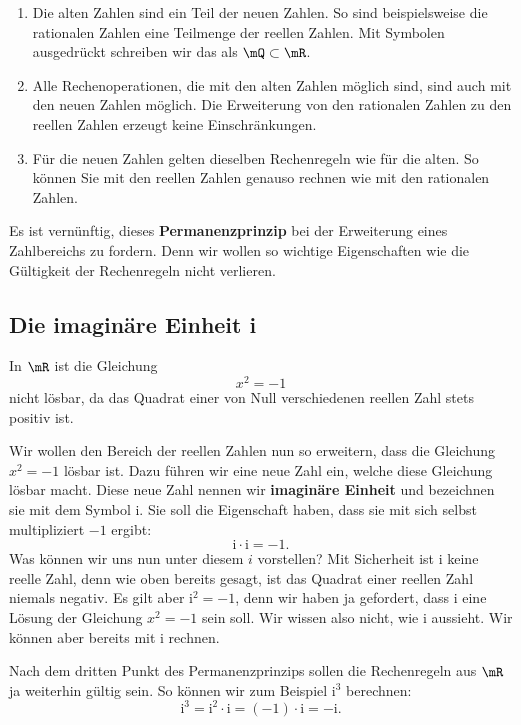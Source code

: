 \documentclass[%
11pt,%
twoside,%
titlepage,%
german,%
headsepline%
]{scrartcl}
\begin{document}
\begin{enumerate}
\item Die alten Zahlen sind ein Teil der neuen Zahlen. So sind beispielsweise die rationalen Zahlen eine Teilmenge der reellen Zahlen. Mit Symbolen ausgedr\"uckt schreiben wir das als $\mQ\subset\mR$.
\item Alle Rechenoperationen, die mit den alten Zahlen m\"oglich sind, sind auch mit den neuen Zahlen m\"oglich. Die Erweiterung von den rationalen Zahlen zu den reellen Zahlen erzeugt keine Einschränkungen.
\item F\"ur die neuen Zahlen gelten dieselben Rechenregeln wie f\"ur die alten. So k\"onnen Sie mit den reellen Zahlen genauso rechnen wie mit den rationalen Zahlen.
\end{enumerate}

Es ist vern\"unftig, dieses \textbf{Permanenzprinzip} bei der Erweiterung eines Zahlbereichs zu fordern. Denn wir wollen so wichtige Eigenschaften wie die G\"ultigkeit der Rechenregeln nicht verlieren.

\subsection{Die imaginäre Einheit i}

In $\mR$ ist die Gleichung
$$x^2=-1$$
nicht l\"osbar, da das Quadrat einer von Null verschiedenen reellen Zahl stets positiv ist.

Wir wollen den Bereich der reellen Zahlen nun so erweitern, dass die Gleichung $x^2 = -1$ l\"osbar ist. Dazu f\"uhren wir eine neue Zahl ein, welche diese Gleichung l\"osbar macht. Diese neue Zahl nennen wir \textbf{imagin\"are Einheit}
und bezeichnen sie mit dem Symbol $\mathrm{i}$. Sie soll die Eigenschaft haben, dass sie mit sich selbst multipliziert $-1$ ergibt:
$$\mathrm{i}\cdot \mathrm{i} = -1.$$
Was k\"onnen wir uns nun unter diesem $i$ vorstellen? Mit Sicherheit ist $\mathrm{i}$ keine reelle Zahl, denn wie oben bereits gesagt, ist das Quadrat einer reellen Zahl niemals negativ. Es gilt aber $\mathrm{i}^2 = -1$, denn wir haben ja gefordert, dass $\mathrm{i}$ eine L\"osung der Gleichung $x^2 = -1$ sein soll.
Wir wissen also nicht, wie $\mathrm{i}$ \glqq aussieht\grqq. Wir k\"onnen aber bereits mit $\mathrm{i}$ rechnen.

\begin{bsp}
Nach dem dritten Punkt des Permanenzprinzips sollen die Rechenregeln aus $\mR$ ja weiterhin g\"ultig sein. So k\"onnen wir zum Beispiel $\mathrm{i}^3$ berechnen:
$$\mathrm{i}^3=\mathrm{i}^2\cdot \mathrm{i}=(-1)\cdot \mathrm{i}=-\mathrm{i}.$$
\end{bsp}
\end{document}
